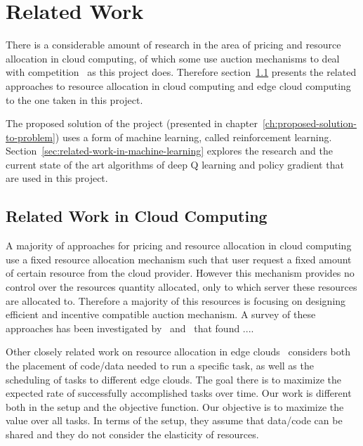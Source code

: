 \chapter{Related Work}\label{ch:background-literature}
There is a considerable amount of research in the area of pricing and resource allocation in cloud computing,
of which some use auction mechanisms to deal with competition~\citep{KUMAR2017234,Zhang2017,Du2019,Bi2019} as this project does.
Therefore section~\ref{sec:related-work-in-cloud-computing} presents the related approaches to resource allocation
in cloud computing and edge cloud computing to the one taken in this project.

The proposed solution of the project (presented in chapter~\ref{ch:proposed-solution-to-problem}) uses a form of
machine learning, called reinforcement learning. Section~\ref{sec:related-work-in-machine-learning} explores the
research and the current state of the art algorithms of deep Q learning and policy gradient that are used in this
project.

\section{Related Work in Cloud Computing}\label{sec:related-work-in-cloud-computing}
A majority of approaches for pricing and resource allocation in cloud computing use a fixed resource allocation
mechanism such that user request a fixed amount of certain resource from the cloud provider. However this mechanism
provides no control over the resources quantity allocated, only to which server these resources are allocated to.
Therefore a majority of this resources is focusing on designing efficient and incentive compatible auction mechanism.
A survey of these approaches has been investigated by~\cite{} and~\cite{} that found ....


Other closely related work on resource allocation in edge clouds~\cite{vaji_infocom} considers both the placement of
code/data needed to run a specific task, as well as the scheduling of tasks to different edge clouds. The goal there
is to maximize the expected rate of successfully accomplished tasks over time. Our work is different both in the setup
and the objective function. Our objective is to maximize the value over all tasks. In terms of the setup, they assume
that data/code can be shared and they do not consider the elasticity of resources.

